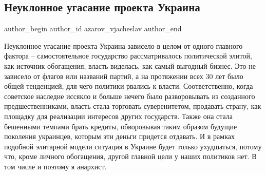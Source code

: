  
 
 
 
 
 
\subsection{Неуклонное угасание проекта Украина}
\label{sec:24_08_2021.fb.azarov_vjacheslav.1.nezalezhnist_ugasanie}
 
\ifcmt
 author_begin
   author_id azarov_vjacheslav
 author_end
\fi

Неуклонное угасание проекта Украина зависело в целом от одного главного фактора
– самостоятельное государство рассматривалось политической элитой, как источник
обогащения, власть виделась, как самый выгодный бизнес. Это не зависело от
флагов или названий партий, а на протяжении всех 30 лет было общей тенденцией,
для чего политики рвались к власти. Соответственно, когда советское наследие
иссякло и больше нечего было разворовывать из созданного предшественниками,
власть стала торговать суверенитетом, продавать страну, как площадку для
реализации интересов других государств. Также она стала бешенными темпами брать
кредиты, обворовывая таким образом будущие поколения украинцев, которым эти
деньги придется отдавать. И в рамках подобной элитарной модели ситуация в
Украине будет только ухудшаться, потому что, кроме личного обогащения, другой
главной цели у наших политиков нет. В том числе и поэтому я анархист.
